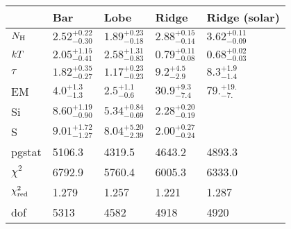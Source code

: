 \begin{tabular}{@{}lllll@{}}
\toprule
 & Bar & Lobe & Ridge & Ridge (solar) \\
\midrule
$N_{\mathrm{H}}$ & ${2.52}^{+0.22}_{-0.30}$ & ${1.89}^{+0.23}_{-0.18}$ & ${2.88}^{+0.15}_{-0.14}$ & ${3.62}^{+0.11}_{-0.09}$ \\ [0.5 em]
$k T$ & ${2.05}^{+1.15}_{-0.41}$ & ${2.58}^{+1.31}_{-0.83}$ & ${0.79}^{+0.11}_{-0.08}$ & ${0.68}^{+0.02}_{-0.03}$ \\ [0.5 em]
$\tau$ & ${1.82}^{+0.35}_{-0.27}$ & ${1.17}^{+0.23}_{-0.23}$ & ${9.2}^{+4.5}_{-2.9}$ & ${8.3}^{+1.9}_{-1.4}$ \\ [0.5 em]
EM & ${4.0}^{+1.3}_{-1.3}$ & ${2.5}^{+1.1}_{-0.6}$ & ${30.9}^{+9.3}_{-7.4}$ & ${79.}^{+19.}_{-7.}$ \\ [0.5 em]
Si & ${8.60}^{+1.19}_{-0.90}$ & ${5.34}^{+0.84}_{-0.69}$ & ${2.28}^{+0.20}_{-0.19}$ &      \\ [0.5 em]
S & ${9.01}^{+1.72}_{-1.27}$ & ${8.04}^{+5.20}_{-2.39}$ & ${2.00}^{+0.27}_{-0.24}$ &      \\
\midrule
pgstat & 5106.3 & 4319.5 & 4643.2 & 4893.3 \\
$\chi^2$ & 6792.9 & 5760.4 & 6005.3 & 6333.0 \\
$\chi^2_{\mathrm{red}}$ & 1.279 & 1.257 & 1.221 & 1.287 \\
dof & 5313 & 4582 & 4918 & 4920 \\
\bottomrule
\end{tabular}

